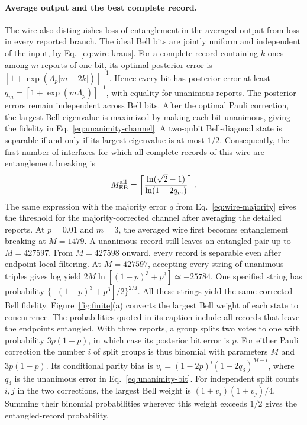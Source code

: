 \documentclass[aps,prl,twocolumn,superscriptaddress,longbibliography,reprint,floatfix]{revtex4-2}
\begin{document}
\paragraph*{Average output and the best complete record.}
The wire also distinguishes loss of entanglement in the averaged output
from loss in every reported branch. The ideal Bell bits are jointly uniform
and independent of the input, by Eq.~\eqref{eq:wire-kraus}. For a complete
record containing $k$ ones among $m$ reports of one bit, its optimal
posterior error is $[1+\exp(\Lambda_p|m-2k|)]^{-1}$. Hence every bit has
posterior error at least
$q_m=[1+\exp(m\Lambda_p)]^{-1}$, with equality for unanimous reports.
The posterior errors remain independent across Bell bits. After the
optimal Pauli correction, the largest Bell eigenvalue is maximized by
making each bit unanimous, giving the fidelity in
Eq.~\eqref{eq:unanimity-channel}. A two-qubit Bell-diagonal state is
separable if and only if its largest eigenvalue is at most $1/2$.
Consequently, the first number of interfaces for which all complete
records of this wire are entanglement breaking is
\begin{equation}
 M_{\rm EB}^{\rm all}
 =\left\lceil
 \frac{\ln(\sqrt{2}-1)}{\ln(1-2q_m)}
 \right\rceil.
 \label{eq:wire-all-record-range}
\end{equation}
The same expression with the majority error $q$ from Eq.~\eqref{eq:wire-majority}
gives the threshold for the majority-corrected channel after averaging
the detailed reports. At $p=0.01$ and $m=3$, the averaged wire first
becomes entanglement breaking at $M=1479$. A unanimous record still
leaves an entangled pair up to $M=427597$. From $M=427598$ onward,
every record is separable even after endpoint-local filtering.
At $M=427597$, accepting every string of unanimous triples gives log yield
$2M\ln[(1-p)^3+p^3]\simeq-25784$. One specified string has probability
$\{[(1-p)^3+p^3]/2\}^{2M}$. All these strings yield the same corrected Bell fidelity.
Figure~\ref{fig:finite}(a) converts the largest Bell weight of each
state to concurrence. The probabilities quoted in its caption include
all records that leave the endpoints entangled. With three reports,
a group splits two votes to one with probability $3p(1-p)$, in which
case its posterior bit error is $p$. For either Pauli correction the
number $i$ of split groups is thus binomial with parameters $M$ and
$3p(1-p)$. Its conditional parity bias is
$v_i=(1-2p)^i(1-2q_3)^{M-i}$, where $q_3$ is the unanimous error
in Eq.~\eqref{eq:unanimity-bit}. For independent split counts $i,j$
in the two corrections, the largest Bell weight is
$(1+v_i)(1+v_j)/4$. Summing their binomial probabilities wherever
this weight exceeds $1/2$ gives the entangled-record probability.
\end{document}
